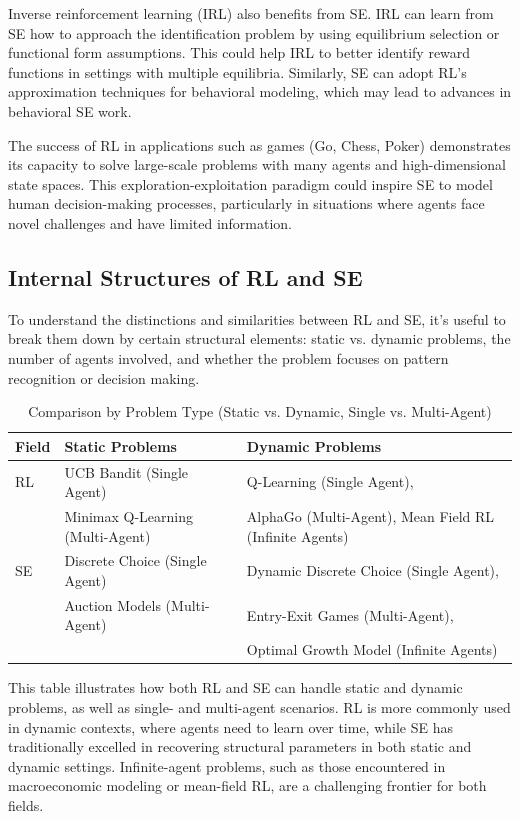Inverse reinforcement learning (IRL) also benefits from SE. IRL can learn from SE how to approach the identification problem by using equilibrium selection or functional form assumptions. This could help IRL to better identify reward functions in settings with multiple equilibria. Similarly, SE can adopt RL’s approximation techniques for behavioral modeling, which may lead to advances in behavioral SE work.

The success of RL in applications such as games (Go, Chess, Poker) demonstrates its capacity to solve large-scale problems with many agents and high-dimensional state spaces. This exploration-exploitation paradigm could inspire SE to model human decision-making processes, particularly in situations where agents face novel challenges and have limited information.

\subsection{Internal Structures of RL and SE}

To understand the distinctions and similarities between RL and SE, it’s useful to break them down by certain structural elements: static vs. dynamic problems, the number of agents involved, and whether the problem focuses on pattern recognition or decision making.

\begin{table}[h!]
\centering
\caption{Comparison by Problem Type (Static vs. Dynamic, Single vs. Multi-Agent)}
\begin{tabular}{|l|l|l|}
\hline
\textbf{Field} & \textbf{Static Problems} & \textbf{Dynamic Problems} \\
\hline
RL & UCB Bandit (Single Agent) & Q-Learning (Single Agent), \\
   & Minimax Q-Learning (Multi-Agent) & AlphaGo (Multi-Agent), Mean Field RL (Infinite Agents) \\
\hline
SE & Discrete Choice (Single Agent) & Dynamic Discrete Choice (Single Agent), \\
   & Auction Models (Multi-Agent) & Entry-Exit Games (Multi-Agent), \\
   & & Optimal Growth Model (Infinite Agents) \\
\hline
\end{tabular}
\end{table}

This table illustrates how both RL and SE can handle static and dynamic problems, as well as single- and multi-agent scenarios. RL is more commonly used in dynamic contexts, where agents need to learn over time, while SE has traditionally excelled in recovering structural parameters in both static and dynamic settings. Infinite-agent problems, such as those encountered in macroeconomic modeling or mean-field RL, are a challenging frontier for both fields.

